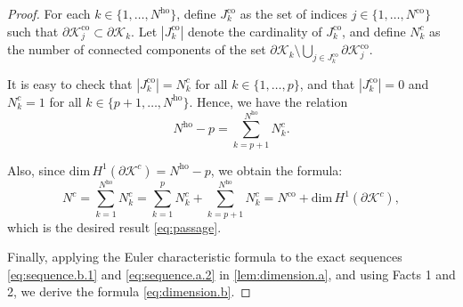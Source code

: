\documentclass[a4paper,twoside,10pt]{article}
\theoremstyle{plain}
\theoremstyle{definition}
\theoremstyle{remark}
\newcommand{\mc}{\mathcal}
\newcommand{\K}{\mc{K}}
\newcommand{\rank}{\mathrm{dim}\,}
\newcommand{\ho}{\mathrm{ho}}
\newcommand{\co}{\mathrm{co}}
\begin{document}
\begin{proof}
For each $k \in \{1, \dots, N^{\ho}\}$, define $J^{\co}_k$ as the set of indices $j \in \{1, \dots, N^{\co}\}$ such that $\partial \K^{\co}_j \subset \partial \K_k$.
Let $|J^{\co}_k|$ denote the cardinality of $J^{\co}_k$, and define $N^{c}_k$ as the number of connected components of the set $\partial \K_k \setminus \bigcup_{j \in J^{\co}_k} \partial \K^{\co}_j$.

It is easy to check that $|J^{\co}_k| = N^{c}_k$ for all $k \in \{1, \dots, p\}$, and that $|J^{\co}_k|
= 0$ and $N^{c}_k =1$ for all $k \in \{p+1, \dots, N^{\ho}\}$.
Hence, we have the relation \[N^{\ho} - p = \sum_{k=p+1}^{N^{\ho}} N^{c}_k.\]

Also, since $\rank{H^1(\partial \K^{c})} = N^{\ho} -p$, we obtain the formula:
\begin{equation*}
N^{c}
=\sum_{k=1}^{N^{\ho}} N^{c}_k
=\sum_{k=1}^{p} N^{c}_k + \sum_{k=p+1}^{N^{\ho}} N^{c}_k 
= N^{\co} + \rank{H^1(\partial \K^{c})},
\end{equation*}
which is the desired result \cref{eq:passage}.

Finally, applying the Euler characteristic formula \cite[Theorem 2.44]{hatcher} to the exact sequences \cref{eq:sequence.b.1} and \cref{eq:sequence.a.2} in \cref{lem:dimension.a}, and using Facts 1 and 2, we derive the formula \cref{eq:dimension.b}.
\end{proof}
\end{document}

